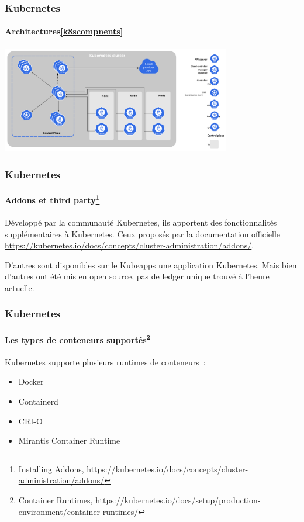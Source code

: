 \documentclass{beamer}
\begin{document}
    \begin{frame}
        \transdissolve
        \frametitle{Kubernetes}
        \framesubtitle{Architectures\cref{k8scompnents}}
        \centering
        \includegraphics[width=10cm]{image/components-of-kubernetes.png}
    \end{frame}

    \begin{frame}
        \transdissolve
        \frametitle{Kubernetes}
        \framesubtitle{Addons et third party\footnote{Installing Addons, \url{https://kubernetes.io/docs/concepts/cluster-administration/addons/}}}
        Développé par la communauté Kubernetes, ils apportent des fonctionnalités supplémentaires à Kubernetes.
        \bigbreak
        Ceux proposés par la documentation officielle \url{https://kubernetes.io/docs/concepts/cluster-administration/addons/}.

        D'autres sont disponibles sur le \href{https://hub.kubeapps.com/}{Kubeapps} une application Kubernetes.
        \bigbreak
        Mais bien d'autres ont été mis en open source, pas de ledger unique trouvé à l'heure actuelle.
    \end{frame}

    \begin{frame}
        \transdissolve
        \frametitle{Kubernetes}
        \framesubtitle{Les types de conteneurs supportés\footnote{Container Runtimes, \url{https://kubernetes.io/docs/setup/production-environment/container-runtimes/}}}
        Kubernetes supporte plusieurs runtimes de conteneurs~:
        \begin{itemize}
            \item Docker
            \item Containerd
            \item CRI-O
            \item Mirantis Container Runtime
        \end{itemize}
    \end{frame}
\end{document}
